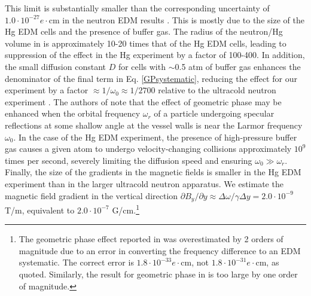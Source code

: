 \documentclass [10pt, twoside] {uwthesis}[2012/04/02]
\begin{document}
This limit is substantially smaller than the corresponding uncertainty of $1.0\cdot 10^{-27} e \cdot \text{cm}$ in the neutron EDM results \cite{2006_ILL_nEDM}. This is mostly due to the size of the Hg EDM cells and the presence of buffer gas. The radius of the neutron/Hg volume in \cite{2006_ILL_nEDM} is approximately 10-20 times that of the Hg EDM cells, leading to suppression of the effect in the Hg experiment by a factor of 100-400. In addition, the small diffusion constant $D$ for cells with $\sim$0.5 atm of buffer gas enhances the denominator of the final term in Eq. \ref{GPsystematic}, reducing the effect for our experiment by a factor $\approx 1/\omega_0 \approx 1/2700$ relative to the ultracold neutron experiment \cite{2006_ILL_nEDM}. The authors of \cite{2005_Lamoreaux_and_Golub_nEDM_geometric_phase} note that the effect of geometric phase may be enhanced when the orbital frequency $\omega_r$ of a particle undergoing specular reflections at some shallow angle at the vessel walls is near the Larmor frequency $\omega_0$. In the case of the Hg EDM experiment, the presence of high-pressure buffer gas causes a given atom to undergo velocity-changing collisions approximately $10^9$ times per second, severely limiting the diffusion speed and ensuring $\omega_0 \gg \omega_r$. Finally, the size of the gradients in the magnetic fields is smaller in the Hg EDM experiment than in the larger ultracold neutron apparatus. We estimate the magnetic field gradient in the vertical direction $\partial B_y / \partial y \approx \Delta \omega / \gamma \Delta y  = 2.0 \cdot 10^{-9}$ T/m, equivalent to $2.0 \cdot 10^{-7}$ G/cm.\footnote{The geometric phase effect reported in \cite{2009_Hg_EDM} was overestimated by 2 orders of magnitude due to an error in converting the frequency difference to an EDM systematic. The correct error is $1.8\cdot10^{-33} e \cdot \text{cm}$, not $1.8\cdot10^{-31} e \cdot \text{cm}$, as quoted. Similarly, the result for geometric phase in \cite{2013_Hg_EDM_PRA} is too large by one order of magnitude.} 
\end{document}
